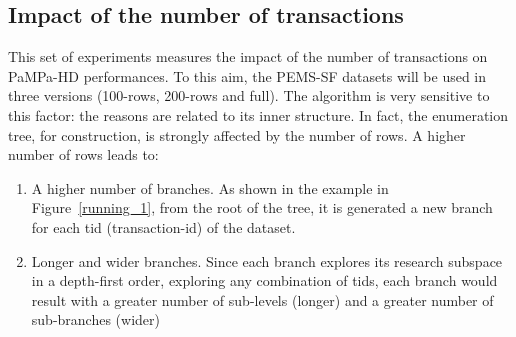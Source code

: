 
\subsection{Impact of the number of transactions}\label{number_rows}
This set of experiments measures the impact of the number of transactions on PaMPa-HD performances. To this aim, the PEMS-SF datasets will be used in three versions (100-rows, 200-rows and full).
The algorithm is very sensitive to this factor: the reasons are related to its inner structure. In fact, the enumeration tree, for construction, is strongly affected by the number of rows. A higher number of rows leads to:
\begin{enumerate}
\item A higher number of branches. As shown in the example in Figure~\ref{running_1}, from the root of the tree, it is generated a new branch for each tid (transaction-id) of the dataset.
\item Longer and wider branches. Since each branch explores its research subspace in a depth-first order, exploring any combination of tids, each branch would result with a greater number of sub-levels (longer) and a greater number of sub-branches (wider)
\end{enumerate}


